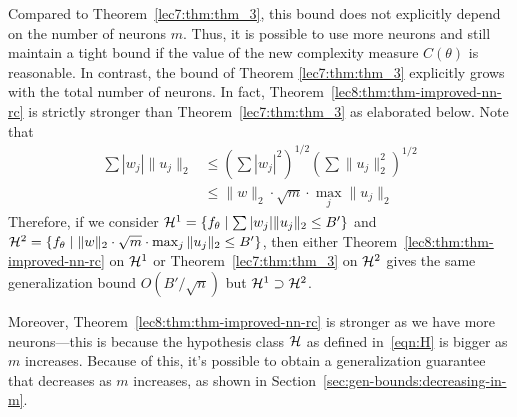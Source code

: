 \begin{remark}
	Compared to Theorem~\ref{lec7:thm:thm_3}, this bound does not explicitly depend on the number of neurons $m$. Thus, it is possible to use more neurons and still maintain a tight bound if the value of the new complexity measure $C(\theta)$ is reasonable. In contrast, the bound of Theorem \ref{lec7:thm:thm_3} explicitly grows with the total number of neurons. In fact, Theorem~\ref{lec8:thm:thm-improved-nn-rc} is strictly stronger than Theorem~\ref{lec7:thm:thm_3} as elaborated below. Note that 
	\begin{align}
		\sum |w_j|\|u_j\|_2 &\le \left(\sum |w_j|^2\right)^{1/2} \left(\sum\|u_j\|_2^2\right)^{1/2} \tag{by Cauchy-Schwarz inequality} \\
		& \le \|w\|_2 \cdot \sqrt{m} \cdot \max_{j}\|u_j\|_2
	\end{align}
	Therefore, if we consider $\mathcal H^1 = \{f_\theta \mid \sum |w_j|\|u_j\|_2\le B'\}$ and $\mathcal H^2 = \{f_\theta \mid \|w\|_2 \cdot \sqrt{m} \cdot \max_{j}\|u_j\|_2 \le B'\}$, then either Theorem~\ref{lec8:thm:thm-improved-nn-rc} on $\mathcal H^1$ or Theorem~\ref{lec7:thm:thm_3} on $\mathcal H^2$ gives the same generalization bound $O(B'/\sqrt{n})$ but $\mathcal H^1 \supset \mathcal H^2$. 
	
	Moreover, Theorem~\ref{lec8:thm:thm-improved-nn-rc} is stronger as we have more neurons---this is because the hypothesis class $\mathcal H$ as defined in~\eqref{eqn:H} is bigger as $m$ increases. Because of this, it's possible to obtain a generalization guarantee that decreases as $m$ increases, as shown in Section~\ref{sec:gen-bounds:decreasing-in-m}. 
	
\end{remark}

